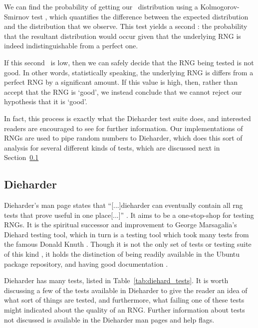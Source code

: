 We can find the probability of getting our \pvalue~distribution using a Kolmogorov-Smirnov test \cite{}, which quantifies the difference between the expected distribution and the \pvalue distribution that we observe. This test yields a second \pvalue: the probability that the resultant distribution would occur given that the underlying RNG is indeed indistinguishable from a perfect one.

If this second \pvalue~is low, then we can safely decide that the RNG being tested is not good. In other words, statistically speaking, the underlying RNG is differs from a perfect RNG by a significant amount. If this value is high, then, rather than accept that the RNG is `good', we instead conclude that we cannot reject our hypothesis that it is `good'.

In fact, this process is exactly what the Dieharder test suite does, and interested readers are encouraged to see \cite{dieharder_manual} for further information. Our implementations of RNGs are used to pipe random numbers to Dieharder, which does this sort of analysis for several different kinds of tests, which are discussed next in Section~\ref{sec:dieharder}

\subsection{Dieharder}
\label{sec:dieharder}

Dieharder's man page states that ``[...]dieharder can eventually contain all rng tests that prove useful in one place[...]'' \cite{dieharder_website}. It aims to be a one-stop-shop for testing RNGs. It is the spiritual successor and improvement to George Marsagalia's Diehard testing tool, which in turn is a testing tool which took many tests from the famous Donald Knuth \cite{diehard}. Though it is not the only set of tests or testing suite of this kind \cite{donald1999art,diehard,nisttoolkit,L'Ecuyer:2007:TCL:1268776.1268777}, it holds the distinction of being readily available in the Ubuntu package repository, and having good documentation \cite{dieharder_manual}.

Dieharder has many tests, listed in Table~\ref{tab:diehard_tests}. It is worth discussing a few of the tests available in Dieharder to give the reader an idea of what sort of things are tested, and furthermore, what failing one of these tests might indicated about the quality of an RNG. Further information about tests not discussed is available in the Dieharder man pages and help flags.

